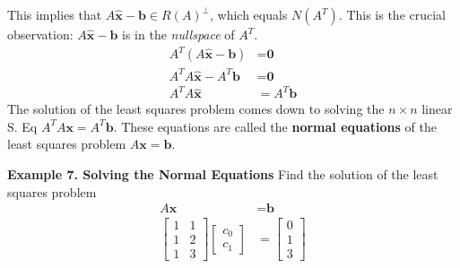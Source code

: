 \documentclass{article}
\newcommand\B{\textbf}
\newcommand\x{\times}
\begin{document}
    This implies that $A\hat{\B{x}} - \B{b} \in  R(A)^\perp$, which equals $N(A^T)$. This is the crucial observation:
    $A\hat{\B{x}} - \B{b}$ is in the \textit{nullspace} of $A^T$.
    \begin{equation*}
        \begin{split}
            A^T (A\hat{\B{x}} - \B{b}) & = \B{0} \\
            A^TA\hat{\B{x}} - A^T\B{b} & = \B{0}\\
            A^TA\hat{\B{x}} & = A^T\B{b}
        \end{split}
    \end{equation*}
    The solution of the least squares problem comes down to solving the $n \x n$ linear S. Eq $A^TA\B{x} = A^T\B{b}$.
    These equations are called the \B{normal equations} of the least squares problem $A\B{x} = \B{b}$.

    \B{Example 7. \textcolor{blue5}{Solving the Normal Equations}}
    Find the solution of the least squares problem 
    \begin{equation*}
        \begin{split}
            A\B{x} & = \B{b} \\
            \begin{bmatrix}
                1 & 1 \\
                1 & 2 \\
                1 & 3
            \end{bmatrix}
            \begin{bmatrix}
                c_0 \\
                c_1
            \end{bmatrix} &= 
            \begin{bmatrix}
                0 \\
                1 \\
                3
            \end{bmatrix}
        \end{split}
    \end{equation*}
\end{document}
